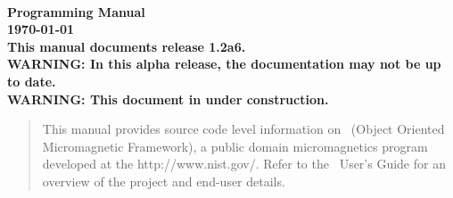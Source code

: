 
\usepackage{l2hbugs}




\nocite{*}  %


\begin{titlepage}
\label{page:contents}
\par
\vspace*{\fill}
\begin{center}
\Large\bf
\OOMMF\\
Programming Manual\\[2ex]
\large
{\today}
{}\\[2ex]
This manual documents release 1.2a6.\\[1ex]
WARNING: In this alpha release, the
documentation may not be up to date.\\[1ex]
WARNING: This document in under construction.

\end{center}
\vspace{10\baselineskip}
\begin{abstract}
This manual provides source code level information on \OOMMF\ (Object Oriented Micromagnetic Framework),
a public domain micromagnetics program developed at the
{http://www.nist.gov/}.  Refer to the \OOMMF\ User's Guide for an
overview of the project and end-user details.
\end{abstract}
\vspace*{\fill}
\par
\end{titlepage}

\begin{latexonly}
\tableofcontents
\end{latexonly}


\newpage

\newpage







%
%






\printindex



